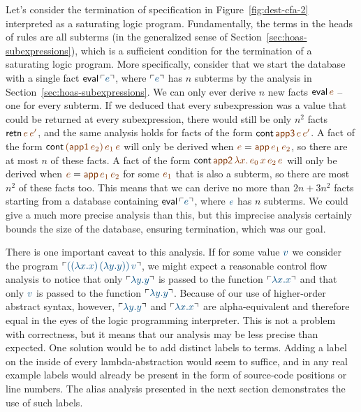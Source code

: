 Let's consider the termination of specification in
Figure~\ref{fig:dest-cfa-2} interpreted as a saturating logic program.
Fundamentally, the terms in the heads of rules are all subterms (in
the generalized sense of Section~\ref{sec:hoas-subexpressions}), which
is a sufficient condition for the termination of a saturating logic
program. More specifically, consider that we start the database with a
single fact ${\sf eval}\,\interp{e}$, where $\interp{e}$ has $n$
subterms by the analysis in Section~\ref{sec:hoas-subexpressions}.  We
can only ever derive $n$ new facts ${\sf eval}\,\lf{e}$ -- one for
every subterm. If we deduced that every subexpression was a value that
could be returned at every subexpression, there would still be only
$n^2$ facts ${\sf retn}\,\lf{e}\,\lf{e'}$, and the same analysis holds
for facts of the form ${\sf cont}\,\lf{\sf app3}\,\lf{e}\,\lf{e'}$.  A
fact of the form ${\sf cont}\,\lf{({\sf
    app1}\,e_2)}\,\lf{e_1}\,\lf{e}$ will only be derived when $\lf{e}
= \lf{{\sf app}\,e_1\,e_2}$, so there are at most $n$ of these
facts. A fact of the form ${\sf cont}\,\lf{{\sf app2}\,\lambda
  x.\,e_0\,x}\,\lf{e_2}\,\lf{e}$ will only be derived when $\lf{e} =
\lf{{\sf app}\,\lf{e_1}\,\lf{e_2}}$ for some $\lf{e_1}$ that is also a
subterm, so there are most $n^2$ of these facts too. This means that
we can derive no more than $2n + 3n^2$ facts starting from a database
containing ${\sf eval}\,\interp{e}$, where $\obj{e}$ has $n$ subterms.
We could give a much more precise analysis than this, but this
imprecise analysis certainly bounds the size of the database, ensuring
termination, which was our goal.

There is one important caveat to this analysis. If for some value
$\obj{v}$ we consider the program $\interp{((\lambda x.x)\,(\lambda
  y.y))\,v}$, we might expect a reasonable control flow analysis to
notice that only $\interp{\lambda y.y}$ is passed to the function
$\interp{\lambda x.x}$ and that only $\obj{v}$ is passed to the
function $\interp{\lambda y.y}$. Because of our use of higher-order
abstract syntax, however, $\interp{\lambda y.y}$ and $\interp{\lambda
  x.x}$ are alpha-equivalent and therefore equal in the eyes of the
logic programming interpreter. This is not a problem with correctness,
but it means that our analysis may be less precise than expected. One
solution would be to add distinct labels to terms. Adding a label on
the inside of every lambda-abstraction would seem to suffice, and in
any real example labels would already be present in the form of
source-code positions or line numbers. The alias analysis presented in
the next section demonstrates the use of such labels.

